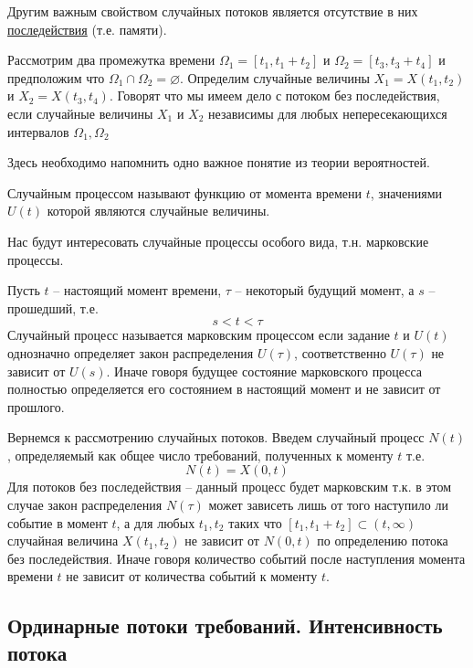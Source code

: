 Другим важным свойством случайных потоков является отсутствие в них \underline{последействия} (т.е. памяти). 

\begin{definition}
	Рассмотрим два промежутка времени $\Omega_1 = [t_1, t_1 + t_2]$ и $\Omega_2 = [t_3, t_3 + t_4]$ и предположим что $\Omega_1 \cap \Omega_2 = \varnothing$. Определим случайные величины
	$X_1 = X(t_1, t_2)$ и $X_2 = X(t_3, t_4)$. Говорят что мы имеем дело с потоком {\color{red}без последействия}, если случайные величины $X_1$ и $X_2$ независимы для любых непересекающихся интервалов $\Omega_1, \Omega_2$
\end{definition}

Здесь необходимо напомнить одно важное понятие из теории вероятностей.

\begin{definition}
	{\color{red}Случайным процессом} называют функцию от момента времени $t$, значениями $U(t)$ которой являются случайные величины.
\end{definition}

Нас будут интересовать случайные процессы особого вида, т.н. марковские процессы.

\begin{definition}
	Пусть $t$ -- настоящий момент времени, $\tau$ -- некоторый будущий момент, а $s$ -- прошедший, т.е. 
	$$s < t < \tau$$
	Случайный процесс называется {\color{red}марковским процессом} если задание $t$ и $U(t)$ однозначно определяет закон распределения $U(\tau)$, соответственно $U(\tau)$ не зависит от $U(s)$. Иначе говоря будущее состояние марковского процесса полностью определяется его состоянием в настоящий момент и не зависит от прошлого.
\end{definition}

Вернемся к рассмотрению случайных потоков. Введем случайный процесс $N(t)$, определяемый как общее число требований, полученных к моменту $t$ т.е. 
$$N(t) = X(0, t)$$
Для потоков без последействия -- данный процесс будет марковским т.к. в этом случае закон распределения $N(\tau)$ может зависеть лишь от того наступило ли событие в момент $t$, а для любых $t_1, t_2$ таких что $[t_1, t_1 + t_2] \subset (t, \infty)$ случайная величина $X(t_1, t_2)$ не зависит от $N(0, t)$ по определению потока без последействия. Иначе говоря количество событий после наступления момента времени $t$ не зависит от количества событий к моменту $t$.

\subsection{Ординарные потоки требований. Интенсивность потока}

